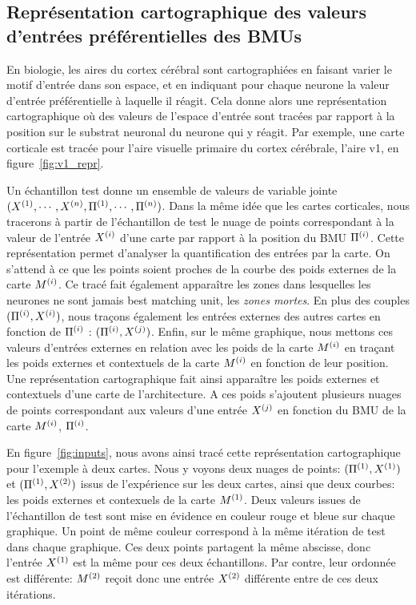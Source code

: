 \documentclass[../main]{subfiles}
\begin{document}
\subsection{Représentation cartographique des valeurs d'entrées préférentielles des BMUs}

En biologie, les aires du cortex cérébral sont cartographiées en faisant varier le motif d'entrée dans son espace, et en indiquant pour chaque neurone la valeur d'entrée préférentielle à laquelle il réagit. Cela donne alors une représentation cartographique où des valeurs de l'espace d'entrée sont tracées par rapport à la position sur le substrat neuronal du neurone qui y réagit.
Par exemple, une carte corticale est tracée pour l'aire visuelle primaire du cortex cérébrale, l'aire v1, en figure~\ref{fig:v1_repr}.

Un échantillon test donne un ensemble de valeurs de variable jointe $(X^{({1})}, \cdots, X^{({n})}, \Pi^{({1})},\cdots, \Pi^{({n})})$.
Dans la même idée que les cartes corticales, nous tracerons à partir de l'échantillon de test le nuage de points correspondant à la valeur de l'entrée $X^{({i})}$ d'une carte par rapport à la position du BMU $\Pi^{({i})}$.
Cette représentation permet d'analyser la quantification des entrées par la carte. 
On s'attend à ce que les points soient proches de la courbe des poids externes de la carte $M^{({i})}$.
Ce tracé fait également apparaître les zones dans lesquelles les neurones ne sont jamais best matching unit, les \emph{zones mortes}.
En plus des couples $(\Pi^{({i})},X^{({i})})$, nous traçons également les entrées externes des autres cartes en fonction de $\Pi^{({i})}$ : $(\Pi^{({i})},X^{({j})})$.
Enfin, sur le même graphique, nous mettons ces valeurs d'entrées externes en relation avec les poids de la carte $M^{({i})}$ en traçant les poids externes et contextuels de la carte $M^{({i})}$ en fonction de leur position.
Une représentation cartographique fait ainsi apparaître les poids externes et contextuels d'une carte de l'architecture. A ces poids s'ajoutent plusieurs nuages de points correspondant aux valeurs d'une entrée $X^{({j})}$ en fonction du BMU de la carte $M^{({i})}$, $\Pi^{({i})}$.

En figure~\ref{fig:inputs}, nous avons ainsi tracé cette représentation cartographique pour l'exemple à deux cartes.
Nous y voyons deux nuages de points: $(\Pi^{({1})},X^{({1})})$ et $(\Pi^{({1})},X^{({2})})$ issus de l'expérience sur les deux cartes, ainsi que deux courbes: les poids externes et contexuels de la carte $M^{({1})}$.
Deux valeurs issues de l'échantillon de test sont mise en évidence en couleur rouge et bleue sur chaque graphique. Un point de même couleur correspond à la même itération de test dans chaque graphique. Ces deux points partagent la même abscisse, donc l'entrée $X^{({1})}$ est la même pour ces deux échantillons. Par contre, leur ordonnée est différente: $M^{({2})}$ reçoit donc une entrée $X^{({2})}$ différente entre de ces deux itérations.
\end{document}
